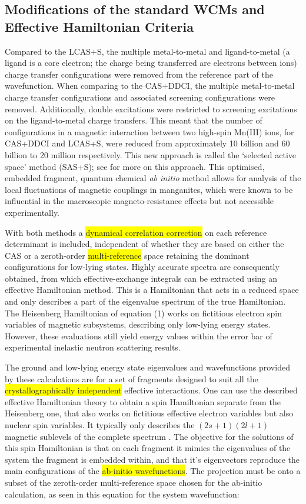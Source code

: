 \documentclass[10pt]{article}
\newcommand{\hilight}[1]{\colorbox{yellow}{#1}}
\begin{document}
\subsection{Modifications of the standard WCMs and Effective Hamiltonian Criteria}

Compared to the LCAS+S, the multiple metal-to-metal and ligand-to-metal (a ligand is a core electron; the charge being transferred are electrons between ions) charge transfer configurations were removed from the reference part of the wavefunction. When comparing to the CAS+DDCI, the multiple metal-to-metal charge transfer configurations and associated screening configurations were removed. Additionally, double excitations were restricted to screening excitations on the ligand-to-metal charge transfers. This meant that the number of configurations in a magnetic interaction between two high-spin Mn(III) ions, for CAS+DDCI and LCAS+S, were reduced from approximately 10 billion and 60 billion  to 20 million respectively. This new approach is called the `selected active space' method (SAS+S); see \cite{gelle2009accurate} for more on this approach. This optimised, embedded fragment, quantum chemical {\it ab initio} method allows for analysis of the local fluctuations of magnetic couplings in manganites, which were known to be influential in the macroscopic magneto-resistance effects but not accessible experimentally.

With both methods a \hilight{dynamical correlation correction} on each reference determinant is included, independent of whether they are based on either the CAS or a zeroth-order \hilight{multi-reference} space retaining the dominant configurations for low-lying states. Highly accurate spectra are consequently obtained, from which effective-exchange integrals can be extracted using an effective Hamiltonian method. This is a Hamiltonian that acts in a reduced space and only describes a part of the eigenvalue spectrum of the true Hamiltonian. The Heisenberg Hamiltonian of equation (1) works on fictitious electron spin variables of magnetic subsystems, describing only low-lying energy states. However, these evaluations still yield energy values within the error bar of experimental inelastic neutron scattering results.

The ground and low-lying energy state eigenvalues and wavefunctions provided by these calculations are for a set of fragments designed to suit all the \hilight{crystallographically independent} effective interactions. One can use the described effective Hamiltonian theory to obtain a spin Hamiltonian separate from the Heisenberg one, that also works on fictitious effective electron variables but also nuclear spin variables. It typically only describes the $(2s+1)(2l+1)$ magnetic sublevels of the complete spectrum \cite{mostafanejad2014basics}. The objective for the solutions of this spin Hamiltonian is that on each fragment it mimics the eigenvalues of the system the fragment is embedded within, and that it's eigenvectors reproduce the main configurations of the \hilight{ab-initio wavefunctions}. The projection must be onto a subset of the zeroth-order multi-reference space chosen for the ab-initio calculation, as seen in this equation for the system wavefunction\cite{gelle2009accurate}:
\end{document}

